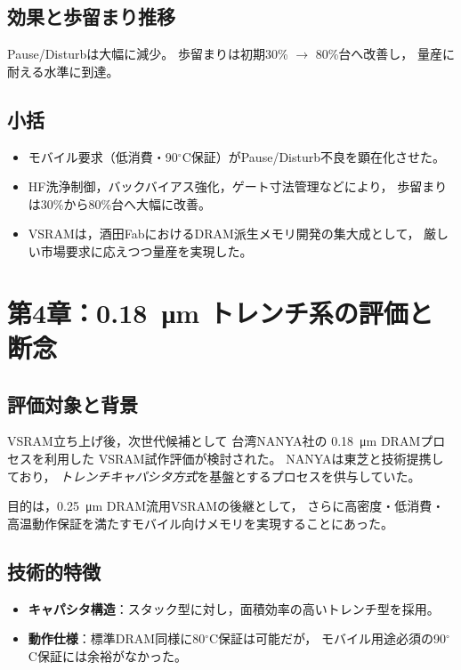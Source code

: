 \documentclass[conference]{IEEEtran}
\begin{document}
\subsection{効果と歩留まり推移}
Pause/Disturbは大幅に減少。
歩留まりは初期30\% $\rightarrow$ 80\%台へ改善し，
量産に耐える水準に到達。

\subsection{小括}
\begin{itemize}
  \item モバイル要求（低消費・90$^\circ$C保証）がPause/Disturb不良を顕在化させた。
  \item HF洗浄制御，バックバイアス強化，ゲート寸法管理などにより，
        歩留まりは30\%から80\%台へ大幅に改善。
  \item VSRAMは，酒田FabにおけるDRAM派生メモリ開発の集大成として，
        厳しい市場要求に応えつつ量産を実現した。
\end{itemize}

\section{第4章：\texorpdfstring{\SI{0.18}{\micro\meter}}{0.18μm} トレンチ系の評価と断念}

\subsection{評価対象と背景}
VSRAM立ち上げ後，次世代候補として
台湾NANYA社の \SI{0.18}{\micro\meter} DRAMプロセスを利用した
VSRAM試作評価が検討された。
NANYAは東芝と技術提携しており，
\emph{トレンチキャパシタ方式}を基盤とするプロセスを供与していた。

目的は，\SI{0.25}{\micro\meter} DRAM流用VSRAMの後継として，
さらに高密度・低消費・高温動作保証を満たすモバイル向けメモリを実現することにあった。

\subsection{技術的特徴}
\begin{itemize}
  \item \textbf{キャパシタ構造}：スタック型に対し，面積効率の高いトレンチ型を採用。
  \item \textbf{動作仕様}：標準DRAM同様に80$^\circ$C保証は可能だが，
        モバイル用途必須の90$^\circ$C保証には余裕がなかった。
\end{itemize}
\end{document}
